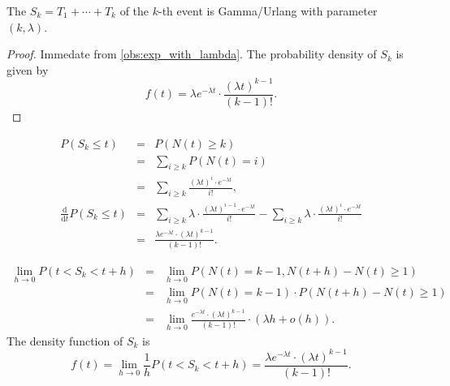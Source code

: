 \begin{observation}
The  $ S_{k} = T_{1} + \cdots + T_{k} $ of the $ k $-th event is Gamma/Urlang with parameter $(k, \lambda) $.
\begin{proof}
Immedate from \autoref{obs:exp_with_lambda}. The probability density of $ S_{k} $ is given by
\[ f(t) = \lambda e^{-\lambda t} \cdot \frac{(\lambda t)^{k - 1}}{(k - 1)!}. \]
\end{proof}

\begin{verification}
\begin{eqnarray*}
P(S_{k} \le t)
  & = & P(N(t) \ge k) \\
  & = & \sum_{i \ge k} P(N(t) = i) \\
  & = & \sum_{i \ge k} \frac{(\lambda t)^{i} \cdot e^{-\lambda t}}{i!}, \\
\frac{\mathrm{d}}{\mathrm{d} t} P(S_{k} \le t)
  & = & \sum_{i \ge k} \lambda \cdot \frac{(\lambda t)^{i - 1} \cdot e^{-\lambda t}}{i!} - \sum_{i \ge k} \lambda \cdot \frac{(\lambda t)^{i} \cdot e^{-\lambda t}}{i!} \\
  & = & \frac{\lambda e^{-\lambda t} \cdot (\lambda t)^{k - 1}}{(k - 1)!}.
\end{eqnarray*}
\end{verification}

\begin{verification}
\begin{eqnarray*}
\lim_{h \to 0} P(t < S_{k} < t + h)
  & = & \lim_{h \to 0} P(N(t) = k - 1, N(t + h) - N(t) \ge 1) \\
  & = & \lim_{h \to 0} P(N(t) = k - 1) \cdot P(N(t + h) - N(t) \ge 1) \\
  & = & \lim_{h \to 0} \frac{e^{-\lambda t} \cdot (\lambda t)^{k - 1}}{(k - 1)!} \cdot (\lambda h + o(h)).
\end{eqnarray*}
The density function of $ S_{k} $ is
\[ f(t) = \lim_{h \to 0} \frac{1}{h} P(t < S_{k} < t + h) = \frac{\lambda e^{-\lambda t} \cdot (\lambda t)^{k - 1}}{(k - 1)!}. \]
\end{verification}
\end{observation}
